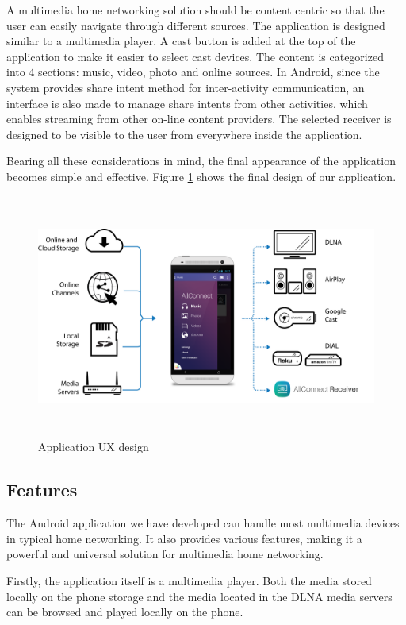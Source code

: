 A multimedia home networking solution should be content centric so that the user
can easily navigate through different sources. The application is designed
similar to a multimedia player. A cast button is added at the top of the
application to make it easier to select cast devices. The content is
categorized into 4 sections: music, video, photo and online sources. In
Android, since the system provides share intent method for inter-activity
communication, an interface is also made to manage share intents from other
activities, which enables streaming from other on-line content providers. The
selected receiver is designed to be visible to the user from everywhere inside
the application.

Bearing all these considerations in mind, the final appearance of the
application becomes simple and effective. Figure \ref{chart5} shows the final
design of our application.

\begin{figure}[htb]
\centering \includegraphics[height=8cm]{charts/allconnect-app}
\caption{Application UX design \label{chart5}}
\end{figure}

\subsection{Features\label{3_4}}
The Android application we have developed can handle most multimedia devices in
typical home networking. It also provides various features, making it a
powerful and universal solution for multimedia home networking.

Firstly, the application itself is a multimedia player. Both the media stored
locally on the phone storage and the media located in the DLNA media servers
can be browsed and played locally on the phone.

